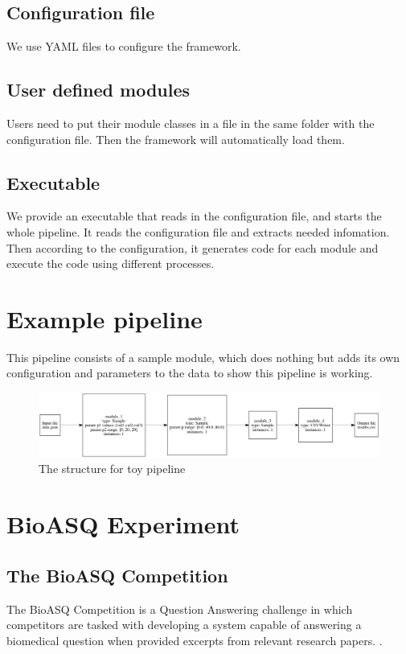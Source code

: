 \documentclass{article}
\begin{document}
    \subsection{Configuration file}
    We use YAML files to configure the framework.

    \subsection{User defined modules}
    Users need to put their module classes in a file in the same folder with the configuration file.
    Then the framework will automatically load them.

    \subsection{Executable}
    We provide an executable that reads in the configuration file, and starts the whole pipeline.
    It reads the configuration file and extracts needed infomation.
    Then according to the configuration, it generates code for each module and execute the code using different processes.


\section{Example pipeline}
    This pipeline consists of a sample module,
    which does nothing but adds its own configuration and parameters to the data to show this pipeline is working.

    \begin{figure}[H]
        \begin{center}
            \includegraphics[width=1.2\textwidth]{fig/toy_pipeline.png}
        \end{center}
        \label{fig:toy_pipeline}
        \caption{The structure for toy pipeline}
    \end{figure}



\section{BioASQ Experiment}

    \subsection{The BioASQ Competition}
    The BioASQ Competition is a Question Answering challenge in which competitors are tasked with developing a system capable of answering a biomedical question when provided
    excerpts from relevant research papers. .
\end{document}
